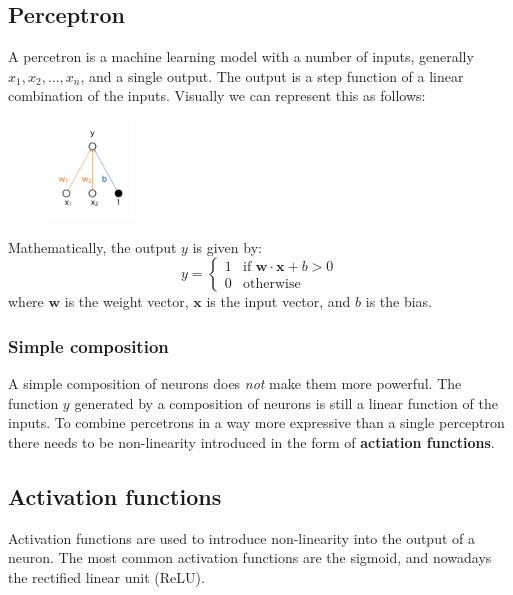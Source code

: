 \documentclass[12pt]{article}
\begin{document}
\subsection{Perceptron}

\begin{definition}[Perceptron]
    A percetron is a machine learning model with a number of inputs, generally $x_1, x_2, \ldots, x_n$, and a single output. The output is a step function of a linear combination of the inputs. Visually we can represent this as follows: 
    \begin{figure}[!h]
        \centering
        \includegraphics[width=0.2\textwidth]{assets/basicperceptron.png}
    \end{figure}
    Mathematically, the output $y$ is given by:
    \[ y = \begin{cases} 1 & \text{if } \mathbf w \cdot  \mathbf x + b > 0 \\ 0 & \text{otherwise} \end{cases} \]
    where $\mathbf w$ is the weight vector, $\mathbf x$ is the input vector, and $b$ is the bias.
\end{definition}

\subsubsection*{Simple composition}

A simple composition of neurons does \textit{not} make them more powerful. The function $y$ generated by a composition of neurons is still a linear function of the inputs. To combine percetrons in a way more expressive than a single perceptron there needs to be non-linearity introduced in the form of \textbf{actiation functions}.

\subsection{Activation functions}

\begin{definition}
    Activation functions are used to introduce non-linearity into the output of a neuron. The most common activation functions are the sigmoid, and nowadays the rectified linear unit (ReLU).
\end{definition}
\end{document}
